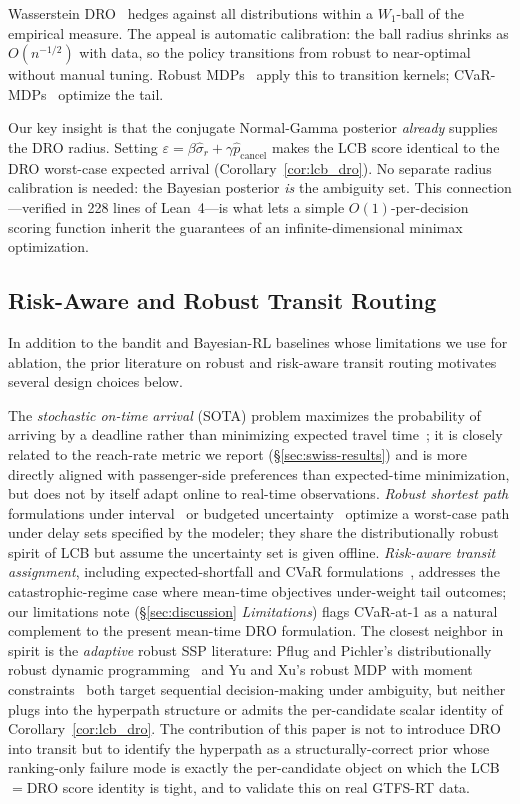 \documentclass[opre,dblanonrev]{informs4}
\begin{document}
Wasserstein DRO~\citep{blanchet2019,esfahani2018} hedges against
all distributions within a $W_1$-ball of the empirical measure.
The appeal is automatic calibration: the ball radius shrinks as
$O(n^{-1/2})$ with data, so the policy transitions from robust
to near-optimal without manual tuning.
Robust MDPs~\citep{nilim2005,iyengar2005} apply this to transition
kernels; CVaR-MDPs~\citep{chow2015} optimize the tail.

Our key insight is that the conjugate Normal-Gamma posterior
\emph{already} supplies the DRO radius.
Setting $\varepsilon = \beta\hat\sigma_r + \gamma\hat{p}_{\mathrm{cancel}}$
makes the LCB score identical to the DRO worst-case expected arrival
(Corollary~\ref{cor:lcb_dro}).
No separate radius calibration is needed: the Bayesian posterior
\emph{is} the ambiguity set.
This connection---verified in 228 lines of Lean~4---is what lets a
simple $O(1)$-per-decision scoring function inherit the guarantees
of an infinite-dimensional minimax optimization.

\subsection{Risk-Aware and Robust Transit Routing}

In addition to the bandit and Bayesian-RL baselines whose
limitations we use for ablation, the prior literature on robust
and risk-aware transit routing motivates several design choices
below.

The \emph{stochastic on-time arrival} (SOTA) problem maximizes the
probability of arriving by a deadline rather than minimizing
expected travel time~\citep{nikolova2006,fan2005}; it is closely
related to the reach-rate metric we report (\S\ref{sec:swiss-results})
and is more directly aligned with passenger-side preferences than
expected-time minimization, but does not by itself adapt online to
real-time observations. \emph{Robust shortest path} formulations
under interval~\citep{karasan2001,bertsimas2003} or budgeted
uncertainty~\citep{bertsimas2004} optimize a worst-case path under
delay sets specified by the modeler; they share the
distributionally robust spirit of LCB but assume the uncertainty set
is given offline. \emph{Risk-aware transit assignment}, including
expected-shortfall and CVaR formulations~\citep{chow2015,fan2005},
addresses the catastrophic-regime case where mean-time objectives
under-weight tail outcomes; our limitations note
(\S\ref{sec:discussion} \emph{Limitations}) flags CVaR-at-1 as a
natural complement to the present mean-time DRO formulation.
The closest neighbor in spirit is the \emph{adaptive} robust SSP
literature: Pflug and Pichler's distributionally robust dynamic
programming~\citep{pflug2014} and Yu and Xu's robust MDP with
moment constraints~\citep{yu2016} both target sequential
decision-making under ambiguity, but neither plugs into the
hyperpath structure or admits the per-candidate scalar identity
of Corollary~\ref{cor:lcb_dro}. The contribution of this paper is
not to introduce DRO into transit but to identify the hyperpath as
a structurally-correct prior whose ranking-only failure mode is
exactly the per-candidate object on which the LCB$=$DRO score
identity is tight, and to validate this on real GTFS-RT data.
\end{document}
